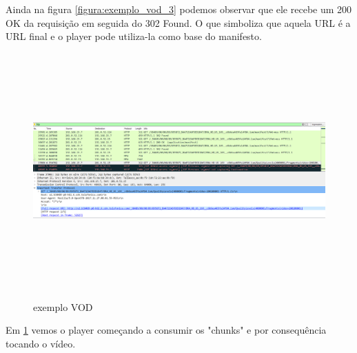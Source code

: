 Ainda na figura \ref{figura:exemplo_vod_3} podemos observar que ele recebe um 200 OK da requisi\c{c}\~ao em seguida do 302 Found. O que simboliza que aquela URL \'e a URL final e o player pode utiliza-la como base do manifesto. 

\begin{figure}[H]
\caption{exemplo VOD}
\includegraphics[height=9cm]{Figuras/exemplo_vod_4.png}
\label{figura:exemplo_vod_4}
\end{figure}

Em \ref{figura:exemplo_vod_4} vemos o player come\c{c}ando a consumir os "chunks" e por consequ\^encia tocando o v\'ideo.